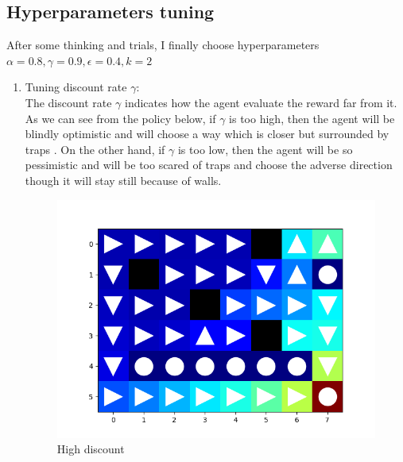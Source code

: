 \documentclass[aps,letterpaper,10pt]{revtex4}
\begin{document}
\subsection{Hyperparameters tuning}
After some thinking and trials, I finally choose hyperparameters $\alpha=0.8, \gamma=0.9, \epsilon=0.4, k=2$
    \begin{enumerate}
        \item Tuning discount rate $\gamma$:\\
        The discount rate $\gamma$ indicates how the agent evaluate the reward far 
        from it. As we can see from the policy below, if $\gamma$ is too high, then the agent will be blindly optimistic and will choose 
        a way which is closer but surrounded by traps . On the other hand, if $\gamma$ is too low, then the agent will 
        be so pessimistic and will be too scared of traps and choose the adverse direction though it 
        will stay still because of walls. 
        \begin{figure}[htbp] 
            \centering 
            \begin{minipage}[t]{0.5\linewidth}
            \centering 
            \includegraphics[scale=0.5]{sarsa_explore.png} 
            \caption{High discount} 
            \end{minipage}%
            \begin{minipage}[t]{0.5\linewidth} 
            \centering 

\end{minipage}
\end{figure}
\end{enumerate}
\end{document}
